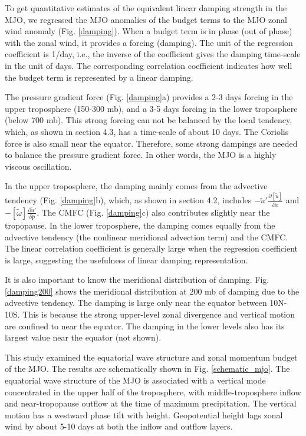 \documentclass[12pt]{article}
\begin{document}

To get quantitative estimates of the equivalent linear damping strength in
the MJO, we regressed the MJO anomalies of the budget terms to the MJO
zonal wind anomaly
(Fig. \ref{damping}).
When a budget term is in phase (out of phase) with the zonal wind,
it provides a forcing (damping).
The unit of the regression coefficient is 1/day, i.e., the inverse of the
coefficient gives the damping time-scale in the unit of days.
The corresponding correlation coefficient indicates how well the budget
term is represented by a linear damping.

The pressure gradient force (Fig. \ref{damping}a) 
provides a 2-3 days forcing in the upper
troposphere (150-300 mb), and a 3-5 days forcing in the lower troposphere
(below 700 mb). 
This strong forcing can not be balanced by the local tendency, which, as shown
in section 4.3, has a time-scale of about 10 days.
The Coriolis force is also small near the equator.
Therefore, some strong dampings are needed to balance the pressure gradient
force. In other words, the MJO is a highly viscous oscillation.

In the upper troposphere, the damping mainly comes from 
the advective tendency (Fig. \ref{damping}b),
which, as shown in section 4.2, includes
$- \widetilde{u} ' \frac{\partial [\widetilde{u}]}{\partial x}$ and
$- [\widetilde{\omega}] \frac{\partial \widetilde{u} '}{\partial p}$.
The CMFC (Fig. \ref{damping}c) also contributes slightly
near the tropopause.
In the lower troposphere, the damping comes equally from the advective tendency
(the nonlinear meridional advection term)
and the CMFC.
The linear correlation coefficient is generally large when the regression
coefficient is large, suggesting the usefulness of linear damping
representation.

It is also important to know the meridional distribution of damping.
Fig. \ref{damping200} shows the meridional distribution at 200 mb of damping due
to the advective tendency.
The damping is large only near the equator between 10N-10S.
This is because the strong upper-level zonal divergence and vertical motion 
are confined to near the equator.
The damping in the lower levels also has its largest value near the equator 
(not shown).
\\


  This study examined the equatorial wave structure and 
zonal momentum budget of the MJO. The results are
schematically shown in Fig. \ref{schematic_mjo}. 
The equatorial wave structure of the MJO 
is associated with a vertical mode concentrated in the upper half of
the troposphere,
with middle-troposphere inflow and near-tropopause outflow at the time
of maximum precipitation.
The vertical motion has a westward phase tilt with height.
Geopotential height lags zonal wind by about 5-10 days at both the
inflow and outflow layers.
\end{document}

